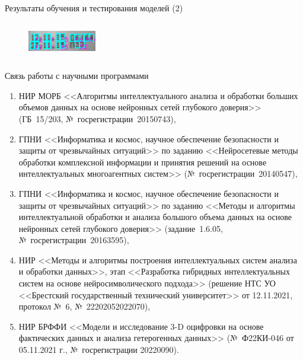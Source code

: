 \documentclass[10pt]{beamer}
\begin{document}
\begin{frame}{Результаты обучения и тестирования моделей (2)}
\begin{columns}
\begin{column}{0.45\textwidth}
\begin{figure}
                    \end{figure}
                    \begin{figure}
                        \centering
                        \includegraphics[width=3cm]{pic4-26.png}
                    \end{figure}
                \end{column}
            \end{columns}
        \end{frame}

        \begin{frame}{Связь работы с научными программами}
            \begin{enumerate}
                \item НИР МОРБ <<Алгоритмы интеллектуального анализа и обработки больших объемов данных на основе нейронных сетей глубокого доверия>> (ГБ~15/203, №~госрегистрации~20150743),
                \item ГПНИ <<Информатика и космос, научное обеспечение безопасности и защиты от чрезвычайных ситуаций>> по заданию <<Нейросетевые методы обработки комплексной информации и принятия решений на основе интеллектуальных многоагентных систем>> (№~госрегистрации~20140547),
                \item \small{ГПНИ <<Информатика и космос, научное обеспечение безопасности и защиты от чрезвычайных ситуаций>> по заданию <<Методы и алгоритмы интеллектуальной обработки и анализа большого объема данных на основе нейронных сетей глубокого доверия>> (задание~1.6.05, №~госрегистрации~20163595)},
                \item НИР <<Методы и алгоритмы построения интеллектуальных систем анализа и обработки данных>>, этап <<Разработка гибридных интеллектуальных систем на основе нейросимволического подхода>> (решение НТС УО <<Брестский государственный технический университет>> от 12.11.2021, протокол №~6, №~22202052022070),
                \item НИР БРФФИ <<Модели и исследование 3-D оцифровки на основе фактических данных и анализа гетерогенных данных>> (№~Ф22КИ-046 от 05.11.2021 г., №~госрегистрации 20220090).            
            \end{enumerate}
        \end{frame}
\end{document}
